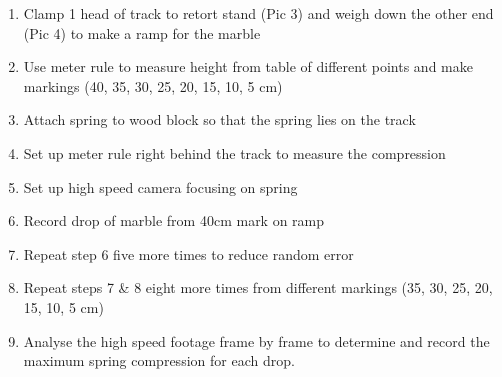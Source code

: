 \begin{enumerate}
    \item Clamp 1 head of track to retort stand (Pic 3) and weigh down the other end (Pic 4) to make a ramp for the marble
    \item Use meter rule to measure height from table of different points and make markings (40, 35, 30, 25, 20, 15, 10, 5 cm)
    \item Attach spring to wood block so that the spring lies on the track
    \item Set up meter rule right behind the track to measure the compression
    \item Set up high speed camera focusing on spring
    \item Record drop of marble from 40cm mark on ramp
    \item Repeat step 6 five more times to reduce random error
    \item Repeat steps 7 \& 8 eight more times from different markings (35, 30, 25, 20, 15, 10, 5 cm)
    \item Analyse the high speed footage frame by frame to determine and record the maximum spring compression for each drop.
\end{enumerate}